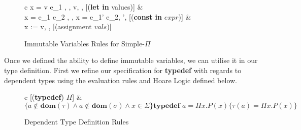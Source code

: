 \documentclass[a4paper,12pt]{report}
\begin{document}
\begin{figure}[H]
  \begin{center}
    \begin{tabular}{c}
      {\langle {}x = v  e_1 , \sigma, \Sigma \rangle 
      \longrightarrow \langle v, \sigma, \Sigma \rangle} [(\textbf{let in} values)] 
      & \\
      {\langle {}x = e_1  e_2 , \sigma, \Sigma \rangle 
      \longrightarrow \langle {}x = e_1'  e_2, \sigma', \Sigma \rangle} 
      [(\textbf{const in} $expr$)]
      & \\
      {\langle x := v, \sigma \rangle \longrightarrow \langle {}, \sigma[x \mapsto v] \rangle} [(assignment $vals$)] \text{ }
    \end{tabular}
  \end{center}
  \caption{Immutable Variables Rules for Simple-$\Pi$}
\end{figure}

\par
Once we defined the ability to define immutable variables, we can utilise it in 
our type definition. First we refine our specification for \textbf{typedef} 
with regards to dependent types using the evaluation rules and Hoare Logic 
defined below. 

\begin{figure}[H]
  \begin{center}
    \begin{tabular}{c}
      [(\textbf{typedef}) $\Pi$] \text{ }    
      & \\
      $\{a \notin \textbf{dom}(\tau) \wedge a \notin \textbf{dom}(\sigma) \wedge x \in \Sigma\}\textbf{typedef }a = \Pi x. P(x)
        \{\tau(a) = \Pi x. P(x)\}$
    \end{tabular}
  \end{center}
  \caption{Dependent Type Definition Rules}
\end{figure}
\end{document}
